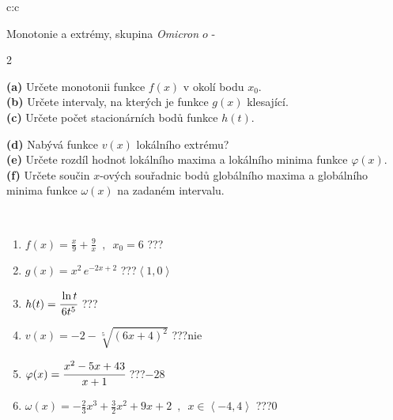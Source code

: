 \documentclass[10pt]{report}
\newcommand\omicron{o}
\begin{document}
\newpage
\thispagestyle{empty}
\begin{tabular}{c:c}
\begin{minipage}[c][104.5mm][t]{0.5\linewidth}
\begin{center}
\vspace{7mm}
{\huge Monotonie a extrémy, skupina \textit{Omicron $\omicron$} -}\\[5mm]
\begin{minipage}{0.95\linewidth}
\begin{center}
{\small \begin{multicols}{2} \raggedright
\textbf{(a)} Určete monotonii funkce \(f(x)\) v okolí bodu \(x_0\). \\[1mm]
\textbf{(b)} Určete intervaly, na kterých je funkce \(g(x)\) klesající. \\[1mm]
\textbf{(c)} Určete počet stacionárních bodů funkce \(h(t)\). \par \columnbreak
\textbf{(d)} Nabývá funkce \(v(x)\) lokálního extrému? \\[1mm]
\textbf{(e)} Určete rozdíl hodnot lokálního maxima a lokálního minima funkce \(\varphi(x)\). \\[1mm]
\textbf{(f)} Určete součin \(x\)-ových souřadnic bodů globálního maxima a globálního minima funkce \(\omega(x)\) na zadaném intervalu. \\[1mm]
\end{multicols}
}
\end{center}
\end{minipage}
\\[4mm]
\begin{minipage}{0.79\linewidth}
\begin{center}
\begin{varwidth}{\linewidth}
\begin{enumerate}
\normalsize
\item $f(x)=\frac{x}{9}+\frac{9}{x} \enspace , \enspace x_0=6$\quad \dotfill\; ???\;\dotfill \quad {}
\item $g(x)=x^2\, e^{-2x+2}$\quad \dotfill\; ???\;\dotfill \quad $\left\langle1 , 0\right\rangle$
\item $h(t)=\cfrac{\ln t}{6t^5}$\quad \dotfill\; ???\;\dotfill {}
\item $v(x)=-2-\sqrt[5]{(6x+4)^2}$\quad \dotfill\; ???\;\dotfill \quad $\text{nie}$
\item $\varphi(x)=\cfrac{x^2-5x+43}{x+1}$\quad \dotfill\; ???\;\dotfill \quad $-28$
\item $\omega(x)=-\frac{2}{3}x^3+\frac{3}{2}x^2+9x+2 \enspace , \enspace x\in\left\langle-4 , 4\right\rangle$\quad \dotfill\; ???\;\dotfill \quad $0$

\end{enumerate}
\end{varwidth}
\end{center}
\end{minipage}
\end{center}
\end{minipage}
\end{tabular}
\end{document}
